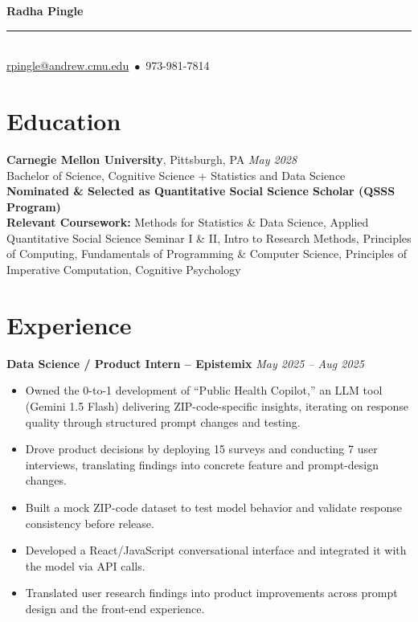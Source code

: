 \documentclass[10.5pt]{article}
\makeatletter
\renewcommand{\maketitle}{
  \begin{center}
    {\LARGE \textbf{Radha Pingle}}\\[0.3em]
    \rule{0.5\textwidth}{0.4pt}\\[0.4em]
    \href{mailto:rpingle@andrew.cmu.edu}{rpingle@andrew.cmu.edu} \,$\bullet$\, 973-981-7814
  \end{center}
  \vspace{-1.0em}
}
\makeatother
\begin{document}
\maketitle

\vspace{-0.5em}
\section{Education}
\textbf{Carnegie Mellon University}, Pittsburgh, PA \hfill \textit{May 2028} \\
Bachelor of Science, Cognitive Science + Statistics and Data
Science\\ 
\textbf{Nominated \& Selected as Quantitative Social Science Scholar (QSSS Program)} \\[0.7em]
\textbf{Relevant Coursework:} Methods for Statistics \& Data Science, Applied Quantitative Social Science Seminar I \& II, Intro to Research Methods, Principles of Computing, Fundamentals of Programming \& Computer Science, Principles of Imperative Computation, Cognitive Psychology


\section{Experience}

\noindent\textbf{Data Science / Product Intern – Epistemix} \hfill \textit{May 2025 – Aug 2025}\\[-1.3em]
\begin{itemize}
  \item Owned the 0-to-1 development of ``Public Health Copilot,'' an LLM tool (Gemini 1.5 Flash) delivering ZIP-code-specific insights, iterating on response quality through structured prompt changes and testing.
  \item Drove product decisions by deploying 15 surveys and conducting 7 user interviews, translating findings into concrete feature and prompt-design changes.
  \item Built a mock ZIP-code dataset to test model behavior and validate response consistency before release.
  \item Developed a React/JavaScript conversational interface and integrated it with the model via API calls.
  \item Translated user research findings into product improvements across prompt design and the front-end experience.
\end{itemize}
\end{document}
